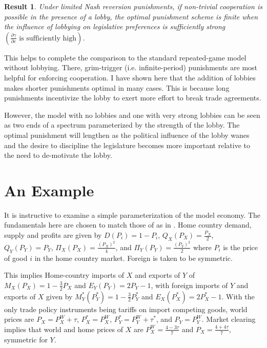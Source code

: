 \documentclass[authoryear, review]{elsarticle}
\newtheorem{result}{Result}
\newcommand{\ga}{\gamma}
\begin{document}
\begin{result}
  Under limited Nash reversion punishments, if non-trivial cooperation is possible in the presence of a lobby, the optimal punishment scheme is finite when the influence of lobbying on legislative preferences is sufficiently strong $\left(\frac{\partial \ga}{\partial e}\text{ is sufficiently high}\right)$.
	\label{res:3}
\end{result}
This helps to complete the comparison to the standard repeated-game model without lobbying. There, grim-trigger (i.e. infinite-period) punishments are most helpful for enforcing cooperation. I have shown here that the addition of lobbies makes shorter punishments optimal in many cases. This is because long punishments incentivize the lobby to exert more effort to break trade agreements.

However, the model with no lobbies and one with very strong lobbies can be seen as two ends of a spectrum parameterized by the strength of the lobby. The optimal punishment will lengthen as the political influence of the lobby wanes and the desire to discipline the legislature becomes more important relative to the need to de-motivate the lobby.



\section{An Example}
\label{sec:example}
It is instructive to examine a simple parameterization of the model economy. The fundamentals here are chosen to match those of \citet{bs2005} as in \citet{buzard2013b}. Home country demand, supply and profits are given by $D(P_i) = 1 - P_i$, $Q_X(P_X) = \frac{P_X}{2}$, $Q_Y(P_Y) = P_Y$, $\Pi_X(P_X) = \frac{(P_X)^2}{4}$, and $\Pi_Y(P_Y) = \frac{(P_Y)^2}{2}$ where $P_i$ is the price of good $i$ in the home country market. %
Foreign is taken to be symmetric.

This implies Home-country imports of $X$ and exports of $Y$ of $M_X(P_X)= 1 - \frac{3}{2}P_X$ and $E_Y(P_Y)= 2P_Y -1$, with foreign imports of $Y$ and exports of $X$ given by $M_Y^*(P_Y^*)= 1 - \frac{3}{2}P_Y^*$ and $E_X(P_X^*)= 2P_X^* -1$. With the only trade policy instruments being tariffs on import competing goods, world prices are $P_X = P_X^W + \tau$, $P_X^* = P_X^W$, $P_Y^* = P_Y^W + \tau^*$, and $P_Y = P_Y^W$. Market clearing implies that world and home prices of $X$ are $P_X^W = \frac{4-3\tau}{7}$ and $P_X = \frac{4+4\tau}{7}$, symmetric for $Y$. \\
\end{document}

